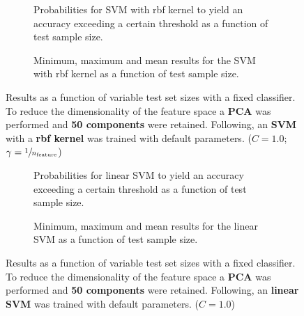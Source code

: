 \begin{figure}
    \captionsetup[subfigure]{justification=justified,singlelinecheck=false}
    \begin{subfigure}[t]{0.61\textwidth}
        
        \caption{Probabilities for SVM with rbf kernel to yield an accuracy exceeding a certain threshold as a function of test sample size.}
    \end{subfigure}
    \hspace{3.0mm}
    \begin{subfigure}[t]{0.34\textwidth}
        
        \caption{Minimum, maximum and mean results for the SVM with rbf kernel as a function of test sample size.}
    \end{subfigure}
    \caption[Effects of varying test sample size. SVM (kernel = rbf); Preprocessing: PCA ($n_\text{components} = \num{50}$)]{Results as a function of variable test set sizes with a fixed classifier. To reduce the dimensionality of the feature space a \textbf{PCA} was performed and \textbf{\num{50} components} were retained. Following, an \textbf{{SVM}} with a \textbf{{rbf kernel}} was trained with default parameters. ($C=\num{1.0}$; $\gamma=\sfrac{1}{n_\text{feature}}$)}
    \label{fig:PCA_50_components_no_selection_SVC}
\end{figure}

\begin{figure}
    \captionsetup[subfigure]{justification=justified,singlelinecheck=false}
    \begin{subfigure}[t]{0.61\textwidth}
        
        \caption{Probabilities for linear SVM to yield an accuracy exceeding a certain threshold as a function of test sample size.}
    \end{subfigure}
    \hspace{3.0mm}
    \begin{subfigure}[t]{0.34\textwidth}
        
        \caption{Minimum, maximum and mean results for the linear SVM as a function of test sample size.}
    \end{subfigure}
    \caption[Effects of varying test sample size. Linear SVM; Preprocessing: PCA ($n_\text{components} = \num{50}$)]{Results as a function of variable test set sizes with a fixed classifier. To reduce the dimensionality of the feature space a \textbf{PCA} was performed and \textbf{\num{50} components} were retained. Following, an \textbf{{linear SVM}} was trained with default parameters. ($C=\num{1.0}$)}
    \label{fig:PCA_50_components_no_selection_LinearSVC}
\end{figure}

